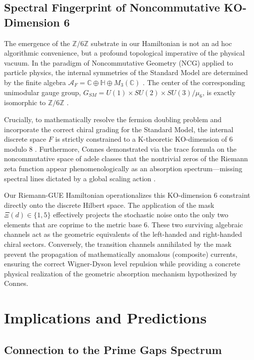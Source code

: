 \documentclass[prl,aps,floatfix,superscriptaddress,10pt]{revtex4-2}
\begin{document}
\subsection{Spectral Fingerprint of Noncommutative KO-Dimension 6}

The emergence of the $\mathbb{Z}/6\mathbb{Z}$ substrate in our Hamiltonian is not an ad hoc algorithmic convenience, but a profound topological imperative of the physical vacuum. In the paradigm of Noncommutative Geometry (NCG) applied to particle physics, the internal symmetries of the Standard Model are determined by the finite algebra $\mathcal{A}_F = \mathbb{C} \oplus \mathbb{H} \oplus M_3(\mathbb{C})$ \cite{Chamseddine2007, Connes2008}. The center of the corresponding unimodular gauge group, $G_{SM} = U(1) \times SU(2) \times SU(3) / \mu_6$, is exactly isomorphic to $\mathbb{Z}/6\mathbb{Z}$ \cite{Connes2008}.

Crucially, to mathematically resolve the fermion doubling problem and incorporate the correct chiral grading for the Standard Model, the internal discrete space $F$ is strictly constrained to a K-theoretic KO-dimension of 6 modulo 8 \cite{Connes2008}. Furthermore, Connes demonstrated via the trace formula on the noncommutative space of adele classes that the nontrivial zeros of the Riemann zeta function appear phenomenologically as an absorption spectrum---missing spectral lines dictated by a global scaling action \cite{Connes1999}.

Our Riemann-GUE Hamiltonian operationalizes this KO-dimension 6 constraint directly onto the discrete Hilbert space. The application of the mask $\Xi(d) \in \{1,5\}$ effectively projects the stochastic noise onto the only two elements that are coprime to the metric base 6. These two surviving algebraic channels act as the geometric equivalents of the left-handed and right-handed chiral sectors. Conversely, the transition channels annihilated by the mask prevent the propagation of mathematically anomalous (composite) currents, ensuring the correct Wigner-Dyson level repulsion while providing a concrete physical realization of the geometric absorption mechanism hypothesized by Connes.

\section{Implications and Predictions}

\subsection{Connection to the Prime Gaps Spectrum}
\end{document}
